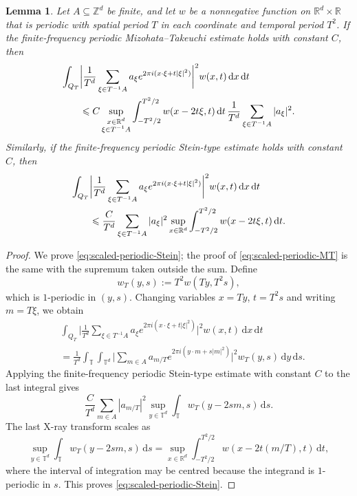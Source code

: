 \documentclass[11pt,reqno]{amsart}
\newtheorem{lemma}[theorem]{Lemma}
\numberwithin{equation}{section}
\newcommand{\dd}{\,\mathrm{d}}
\renewcommand{\leq}{\leqslant}
\begin{document}
\begin{lemma}
Let $A\subseteq\mathbb{Z}^d$ be finite, and let $w$ be a nonnegative function on $\mathbb{R}^d\times\mathbb{R}$ that is periodic with spatial period $T$ in each coordinate and temporal period $T^2$. If the finite-frequency periodic Mizohata--Takeuchi estimate holds with constant $C$, then
\begin{align}\label{eq:scaled-periodic-MT}
\int_{Q_T}&\bigg|\frac{1}{T^d}\sum_{\xi\in T^{-1}A}a_\xi e^{2\pi i(x\cdot\xi+t|\xi|^2)}\bigg|^2w(x,t)\dd x\dd t\notag\\
&\leq C\sup_{\substack{x\in\mathbb{R}^d\\ \xi\in T^{-1}A}}\int_{-T^2/2}^{T^2/2}w(x-2t\xi,t)\dd t\,\frac{1}{T^d}\sum_{\xi\in T^{-1}A}|a_\xi|^2.
\end{align}
Similarly, if the finite-frequency periodic Stein-type estimate holds with constant $C$, then
\begin{align}\label{eq:scaled-periodic-Stein}
\int_{Q_T}&\bigg|\frac{1}{T^d}\sum_{\xi\in T^{-1}A}a_\xi e^{2\pi i(x\cdot\xi+t|\xi|^2)}\bigg|^2w(x,t)\dd x\dd t\notag\\
&\leq \frac{C}{T^d}\sum_{\xi\in T^{-1}A}|a_\xi|^2\sup_{x\in\mathbb{R}^d}\int_{-T^2/2}^{T^2/2}w(x-2t\xi,t)\dd t.
\end{align}
\end{lemma}

\begin{proof}
We prove \eqref{eq:scaled-periodic-Stein}; the proof of \eqref{eq:scaled-periodic-MT} is the same with the supremum taken outside the sum. Define
\[ w_T(y,s):=T^2w(Ty,T^2s), \]
which is $1$-periodic in $(y,s)$. Changing variables $x=Ty$, $t=T^2s$ and writing $m=T\xi$, we obtain
\begin{align*}
& \int_{Q_T} \bigg|\frac{1}{T^d}\sum_{\xi\in T^{-1}A}a_\xi e^{2\pi i(x\cdot\xi+t|\xi|^2)}\bigg|^2 w(x,t)\dd x\dd t\\
& = \frac{1}{T^d} \int_{\mathbb{T}}\int_{\mathbb{T}^d} \bigg|\sum_{m\in A}a_{m/T}e^{2\pi i(y\cdot m+s|m|^2)}\bigg|^2 w_T(y,s)\dd y\dd s.
\end{align*}
Applying the finite-frequency periodic Stein-type estimate with constant $C$ to the last integral gives
\[ \frac{C}{T^d}\sum_{m\in A}|a_{m/T}|^2\sup_{y\in\mathbb{T}^d}\int_{\mathbb{T}}w_T(y-2sm,s)\dd s. \]
The last X-ray transform scales as
\[ \sup_{y\in\mathbb{T}^d}\int_{\mathbb{T}}w_T(y-2sm,s)\dd s
=\sup_{x\in\mathbb{R}^d}\int_{-T^2/2}^{T^2/2}w(x-2t(m/T),t)\dd t, \]
where the interval of integration may be centred because the integrand is $1$-periodic in $s$. This proves \eqref{eq:scaled-periodic-Stein}.
\end{proof}
\end{document}
